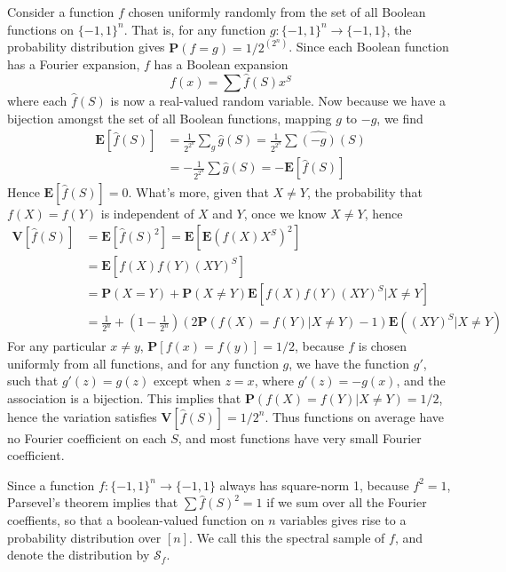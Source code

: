 \begin{example}
    Consider a function $f$ chosen uniformly randomly from the set of all Boolean functions on $\{ -1, 1 \}^n$. That is, for any function $g: \{ -1, 1 \}^n \to \{ -1, 1 \}$, the probability distribution gives $\mathbf{P}(f = g) = 1/2^{(2^n)}$. Since each Boolean function has a Fourier expansion, $f$ has a Boolean expansion
    \[ f(x) = \sum \widehat{f}(S) x^S \]
    where each $\widehat{f}(S)$ is now a real-valued random variable. Now because we have a bijection amongst the set of all Boolean functions, mapping $g$ to $-g$, we find
    \begin{align*}
        \mathbf{E}[\widehat{f}(S)] &= \frac{1}{2^{2^n}} \sum_g \widehat{g}(S) = \frac{1}{2^{2^n}} \sum \widehat{(-g)}(S)\\
        &= - \frac{1}{2^{2^n}} \sum \widehat{g}(S) = -\mathbf{E}[\widehat{f}(S)]
    \end{align*}
    Hence $\mathbf{E}[\widehat{f}(S)] = 0$. What's more, given that $X \neq Y$, the probability that $f(X) = f(Y)$ is independent of $X$ and $Y$, once we know $X \neq Y$, hence
    \begin{align*}
        \mathbf{V}[\widehat{f}(S)] &= \mathbf{E}[\widehat{f}(S)^2] = \mathbf{E} \left[ \mathbf{E} \left( f(X) X^S \right)^2 \right]\\
        &= \mathbf{E}[f(X) f(Y) (XY)^S]\\
        &= \mathbf{P}(X = Y) + \mathbf{P}(X \neq Y) \mathbf{E}[f(X) f(Y) (XY)^S | X \neq Y]\\
        &= \frac{1}{2^n} + \left( 1 - \frac{1}{2^n} \right) (2 \mathbf{P}(f(X) = f(Y)|X \neq Y) - 1) \mathbf{E}((XY)^S | X \neq Y)
    \end{align*}
    For any particular $x \neq y$, $\mathbf{P}[f(x) = f(y)] = 1/2$, because $f$ is chosen uniformly from all functions, and for any function $g$, we have the function $g'$, such that $g'(z) = g(z)$ except when $z = x$, where $g'(z) = -g(x)$, and the association is a bijection. This implies that $\mathbf{P}(f(X) = f(Y) | X \neq Y) = 1/2$, hence the variation satisfies $\mathbf{V}[\widehat{f}(S)] = 1/2^n$. Thus functions on average have no Fourier coefficient on each $S$, and most functions have very small Fourier coefficient.
\end{example}

Since a function $f: \{ -1, 1 \}^n \to \{ -1, 1 \}$ always has square-norm 1, because $f^2 = 1$, Parsevel's theorem implies that $\sum \widehat{f}(S)^2 = 1$ if we sum over all the Fourier coeffients, so that a boolean-valued function on $n$ variables gives rise to a probability distribution over $[n]$. We call this the spectral sample of $f$, and denote the distribution by $\mathcal{S}_f$.

